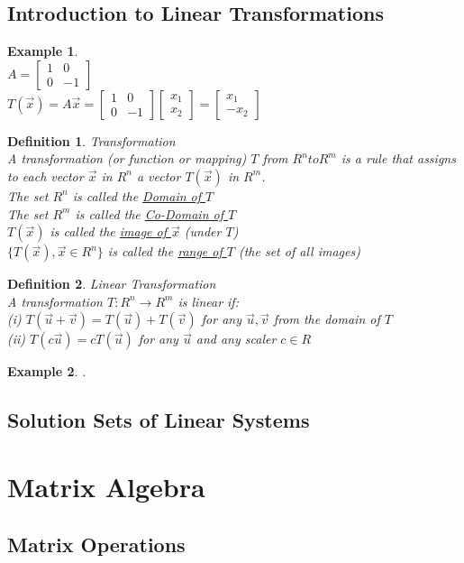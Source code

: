 \documentclass[a4paper,12pt,openany]{book}
\theoremstyle{defn}
\newtheorem{defn}{Definition}[section]
\theoremstyle{expl}
\newtheorem{expl}{Example}[section]
\begin{document}
\section{Introduction to Linear Transformations}
\begin{expl}\-\\
\textup{
$A = \left[\begin{array}{cc}1&0\\0&-1\end{array}\right]$\\
$T(\vec{x})=A\vec{x}=\left[\begin{array}{cc}1&0\\0&-1\end{array}\right]\left[\begin{array}{c}x_1\\x_2\end{array}\right]=\left[\begin{array}{c}x_1\\-x_2\end{array}\right]$\\
}\end{expl}
\begin{defn}
\textup{
Transformation\\
A transformation (or function or mapping) $T$ from $R^n to R^m$ is a rule that assigns to each vector $\vec{x}$ in $R^n$ a vector $T(\vec{x})$ in $R^m$.\\
The set $R^n$ is called the \underline{Domain of $T$}\\
The set $R^m$ is called the \underline{Co-Domain of $T$}\\
$T(\vec{x})$ is called the \underline{image of $\vec{x}$} (under $T$)\\
$\{T(\vec{x}),\vec{x}\in R^n\}$ is called the \underline{range of $T$} (the set of all images)\\
}
\end{defn}

\begin{defn}
\textup{
Linear Transformation\\
A transformation $T: R^n \rightarrow R^m$ is linear if:\\
(i) $T(\vec{u}+\vec{v})=T(\vec{u})+T(\vec{v})$ for any $\vec{u},\vec{v}$ from the domain of $T$\\
(ii) $T(c\vec{u})=cT(\vec{u})$ for any $\vec{u}$ and any scaler $c\in R$\\
}\end{defn}
\begin{expl} 
\textup{
.
}\end{expl}

\section{Solution Sets of Linear Systems}
\chapter{Matrix Algebra}
\section{Matrix Operations}
\end{document}
